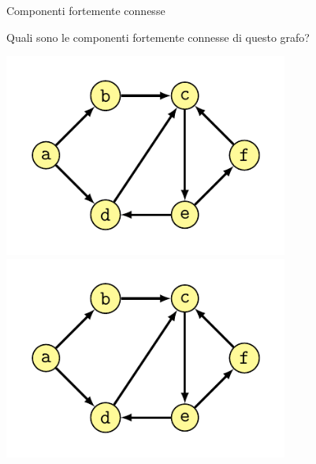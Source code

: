 \begin{frame}{Componenti fortemente connesse}

\vspace{-6pt}
\begin{myboxtitle}[Domanda]
Quali sono le componenti fortemente connesse di questo grafo?
\end{myboxtitle}


\begin{overprint}
\centering\includegraphics[width=0.70\textwidth,page=1]{scc.pdf}
\centering\includegraphics[width=0.70\textwidth,page=2]{scc.pdf}
\end{overprint}

\end{frame}

